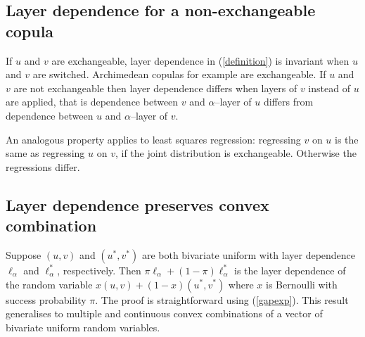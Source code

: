 \documentclass[authoryear]{elsarticle}
\newcommand{\E}{{\mathrm E}}
\newcommand{\eref}[1]{(\ref{#1})}
\begin{document}

\subsection{Layer dependence for a non-exchangeable copula}

If $u$ and $v$ are exchangeable, layer dependence in \eref{definition} is invariant when $u$ and $v$ are switched. Archimedean copulas \citep{mcneil2005qrm} for example are exchangeable. If $u$ and $v$ are not exchangeable then layer dependence differs when layers of $v$ instead of $u$ are applied, that is dependence between $v$ and $\alpha$--layer of $u$ differs from dependence between $u$ and $\alpha$--layer of $v$.

An analogous property applies to least squares regression: regressing $v$ on $u$ is the same as  regressing $u$ on $v$, if the joint distribution is  exchangeable. Otherwise the regressions differ.




\subsection{Layer dependence preserves convex combination}

Suppose $(u,v)$ and $(u^*,v^*)$ are both bivariate uniform with layer dependence $\ell_\alpha$ and $\ell_\alpha^*$, respectively. Then  $\pi\ell_\alpha+(1-\pi)\ell_\alpha^*$ is the layer dependence of  the random variable $x(u,v)+(1-x)(u^*,v^*)$ where $x$ is Bernoulli with success probability $\pi$.  The proof  is straightforward using \eref{gapexp}.  This result generalises to multiple and continuous convex combinations of a vector of bivariate uniform random variables.
\end{document}

